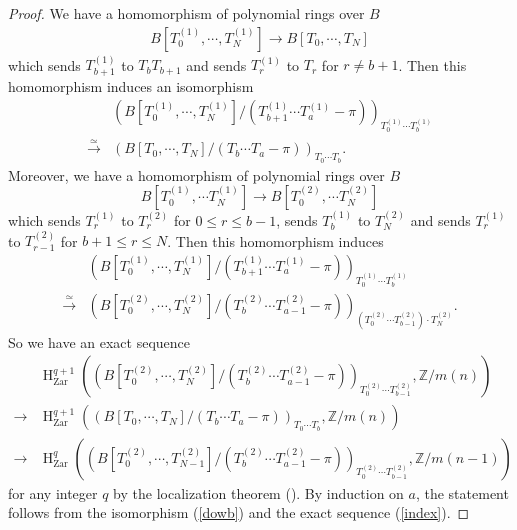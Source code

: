 \documentclass{article}
\newcommand{\Zar}{\mathrm{Zar}}
\newcommand{\HO}{\operatorname{H}}
\begin{document}
%
\begin{proof}
We have a homomorphism of polynomial rings over $B$
%
\begin{align*}
B[T_{0}^{(1)}, 
\cdots, T^{(1)}_{N}]
\to
B[T_{0}, \cdots, T_{N}]
\end{align*}
%
which sends $T^{(1)}_{b+1}$ to $T_{b}T_{b+1}$ and 
sends $T^{(1)}_{r}$ to $T_{r}$ for $r\neq b+1$.
Then this homomorphism induces an isomorphism
%
\begin{align}\label{dowb}
&\left(
B[T^{(1)}_{0}, \cdots, T^{(1)}_{N}]/
(T^{(1)}_{b+1}\cdots T^{(1)}_{a}-\pi)
\right)_{T^{(1)}_{0}\cdots T^{(1)}_{b}}
\nonumber
\\
\xrightarrow{\simeq}
&\left(
B[T_{0}, \cdots, T_{N}]/
(T_{b}\cdots T_{a}-\pi)
\right)_{T_{0}\cdots T_{b}}.
\end{align}
%
Moreover, we have a homomorphism of polynomial rings over $B$
%
\begin{equation*}
B[T^{(1)}_{0}, \cdots T^{(1)}_{N}] 
\to
B[T^{(2)}_{0}, \cdots T^{(2)}_{N}] 
\end{equation*}
%
which sends $T^{(1)}_{r}$ to $T^{(2)}_{r}$ 
for $0\leq r\leq b-1$, 
sends $T_{b}^{(1)}$ to $T_{N}^{(2)}$
and
sends $T^{(1)}_{r}$ to $T^{(2)}_{r-1}$
for $b+1\leq r\leq N$. 
Then this homomorphism induces
%
\begin{align*}
&\left(
B[T^{(1)}_{0}, \cdots, T^{(1)}_{N}]/
(T^{(1)}_{b+1}\cdots T^{(1)}_{a}-\pi)
\right)_{T^{(1)}_{0}\cdots T^{(1)}_{b}}
\\
\xrightarrow{\simeq}
&\left(
B[T^{(2)}_{0}, \cdots, T^{(2)}_{N}]/
(T^{(2)}_{b}\cdots T^{(2)}_{a-1}-\pi)
\right)_{(T^{(2)}_{0}\cdots T^{(2)}_{b-1})\cdot T^{(2)}_{N}}.
\end{align*}
%
So we have an exact sequence
%
\begin{align}\label{index}
&\HO^{q+1}_{\Zar}\left(
\left(
B[T^{(2)}_{0}, \cdots, T^{(2)}_{N}]/
(T^{(2)}_{b}\cdots T^{(2)}_{a-1}-\pi)
\right)_{T^{(2)}_{0}\cdots T^{(2)}_{b-1}},
\mathbb{Z}/m(n)
\right)  
\nonumber
\\
\to
&\HO^{q+1}_{\Zar}\left(
\left(
B[T_{0}, \cdots, T_{N}]/
(T_{b}\cdots T_{a}-\pi)
\right)_{T_{0}\cdots T_{b}},
\mathbb{Z}/m(n)
\right)  
\nonumber
\\
\to
&\HO^{q}_{\Zar}\left(
\left(
B[T^{(2)}_{0}, \cdots, T^{(2)}_{N-1}]/
(T^{(2)}_{b}\cdots T^{(2)}_{a-1}-\pi)
\right)_{T^{(2)}_{0}\cdots T^{(2)}_{b-1}},
\mathbb{Z}/m(n-1)
\right) 
\end{align}
%
for any integer $q$ 
by the localization theorem (\cite[p.779, Theorem 3.2]{Ge}).
By induction on $a$, the statement follows from
the isomorphism (\ref{dowb}) and the exact sequence (\ref{index}).
\end{proof}
%
\end{document}

